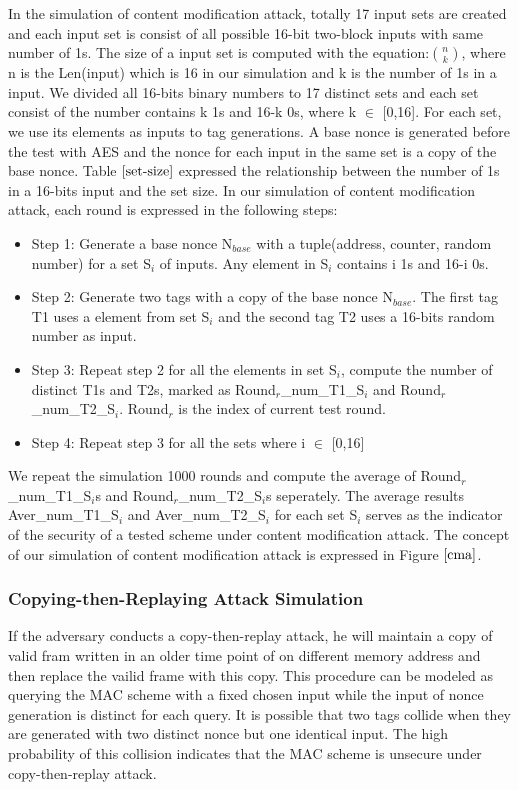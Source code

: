 \documentclass{article}
\begin{document}
In the simulation of content modification attack, totally 17 input sets are created and each input set is consist of all possible 16-bit two-block inputs with same number of 1s. The size of a input set is computed with the equation:$\binom{n}{k}$, where n is the Len(input) which is 16 in our simulation and k is the number of 1s in a input.   
We divided all 16-bits binary numbers to 17 distinct sets and each set consist of the number contains k 1s and 16-k 0s, where k $\in$ [0,16]. For each set, we use its elements as inputs to tag generations. A base nonce is generated before the test with AES and the nonce for each input in the same set is a copy of the base nonce.   
Table $\ref{set-size}$ expressed the relationship between the number of 1s in a 16-bits input and the set size. In our simulation of content modification attack, each round is expressed in the following steps:
\begin{itemize}
	\item Step 1: Generate a base nonce N$_{base}$ with a tuple(address, counter, random number) for a set S$_i$ of inputs. Any element in S$_i$ contains i 1s and 16-i 0s.
	\item Step 2: Generate two tags with a copy of the base nonce N$_{base}$. The first tag T1 uses a element from set S$_i$  and the second tag T2 uses a 16-bits random number as input. 
	\item Step 3: Repeat step 2 for all the elements in set S$_i$, compute the number of distinct T1s and T2s, marked as Round$_r$\_num\_T1\_S$_i$ and Round$_r$\_num\_T2\_S$_i$. Round$_r$ is the index of current test round.
	\item Step 4: Repeat step 3 for all the sets where i $\in$ [0,16] 
\end{itemize}
We repeat the simulation 1000 rounds and compute the average of Round$_r$\_num\_T1\_S$_i$s and Round$_r$\_num\_T2\_S$_i$s seperately. The average results   Aver\_num\_T1\_S$_i$ and Aver\_num\_T2\_S$_i$ for each set S$_i$ serves as the indicator of the security of a tested scheme under content modification attack.
The concept of our simulation of content modification attack is expressed in Figure $\ref{cma}$.

\subsubsection{Copying-then-Replaying Attack Simulation}
If the adversary conducts a copy-then-replay attack, he will maintain a copy of valid fram written in an older time point of on different memory address and then replace the vailid frame with this copy. This procedure can be modeled as querying the MAC scheme with a fixed chosen input while the input of nonce generation is distinct for each query. It is possible that two tags collide when they are generated with two distinct nonce but one identical input. The high probability of this collision indicates that the MAC scheme is unsecure under copy-then-replay attack.  
\end{document}
